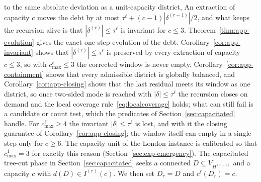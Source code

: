 \documentclass[11pt]{article}
\theoremstyle{definition}
\begin{document}
to the same absolute deviation as a unit-capacity district, An extraction of capacity $c$ moves the debt by at most $\tau^{\ell} + (c-1)|\delta^{(r-1)}|/2$, and what keeps the recursion alive is that $|\delta^{(r)}| \leq \tau^{\ell}$ is invariant for $c \leq 3$. Theorem~\ref{thm:app-evolution} gives the exact one-step evolution of the debt. Corollary~\ref{cor:app-invariant} shows that $|\delta^{(r)}|\le\tau^{\ell}$ is preserved by every extraction of capacity $c\le 3$, so with $c^{\ell}_{\max}\le 3$ the corrected window is never empty. Corollary~\ref{cor:app-containment} shows that every admissible district is globally balanced, and Corollary~\ref{cor:app-closing} shows that the last residual meets its window as one district, so once two-sided mode is reached with $|\delta|\le\tau^{\ell}$ the recursion closes on demand and the local coverage rule~\eqref{eq:localcoverage} holds; what can still fail is a candidate or count test, which the predicates of Section~\ref{sec:capacitated} handle. For $c^{\ell}_{\max}\ge 4$ the invariant $|\delta|\le\tau^{\ell}$ is lost, and with it the closing guarantee of Corollary~\ref{cor:app-closing}; the window itself can empty in a single step only for $c \geq 6$. The capacity unit of the London instance is calibrated so that $c^1_{\max}=3$ for exactly this reason (Section~\ref{sec:exp-emergency}). The capacitated tree-cut phase in
Section~\ref{sec:capacitated} seeks a connected $D\subseteq V_{H^{(r-1)}}$ and a capacity $c$ with $d(D)\in I^{(r)}(c)$. We then set $D_r=D$ and $c^{\ell}(D_r)=c$.
\end{document}
